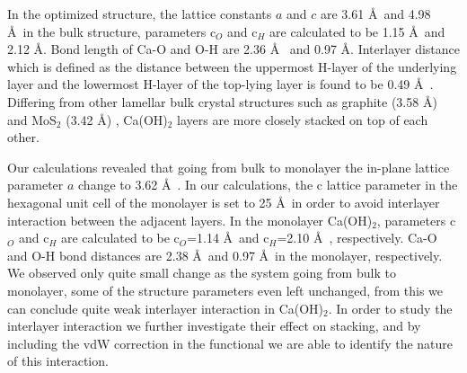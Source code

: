 In the optimized structure, the lattice constants $a$ and $c$ are 3.61 \AA~and 4.98 \AA~in the bulk structure, parameters c$_O$ and c$_H$ are calculated to be 1.15 \AA~and 2.12 \AA . Bond length of Ca-O and O-H are 2.36 \AA~ and 0.97 \AA . Interlayer distance which is defined as the distance between the uppermost H-layer of the underlying layer and the lowermost H-layer  of the top-lying layer is found to be 0.49 \AA~. Differing from other lamellar bulk crystal structures such as graphite (3.58 \AA) and MoS$_{2}$ (3.42 \AA)\cite{can} , Ca(OH)$_{2}$ layers are more closely stacked on top of each other. 

Our calculations revealed that going from bulk to monolayer the in-plane lattice parameter $a$ change to 3.62 \AA~. In our calculations, the c lattice parameter in the hexagonal unit cell of the monolayer is set to 25 \AA~in order to avoid interlayer interaction between the adjacent layers. In the monolayer Ca(OH)$_2$, parameters c$_O$ and c$_H$ are calculated to be c$_O$=1.14 \AA~and c$_{H}$=2.10 \AA~, respectively. Ca-O and O-H bond distances are 2.38 \AA~and 0.97 \AA~in the monolayer, respectively. We observed only quite small change as the system going from bulk to monolayer, some of the structure parameters even left unchanged, from this we can conclude quite weak interlayer interaction in Ca(OH)$_2$. In order to study the interlayer interaction we further investigate their effect on stacking, and by including the vdW correction in the functional we are able to identify the nature of this interaction.

